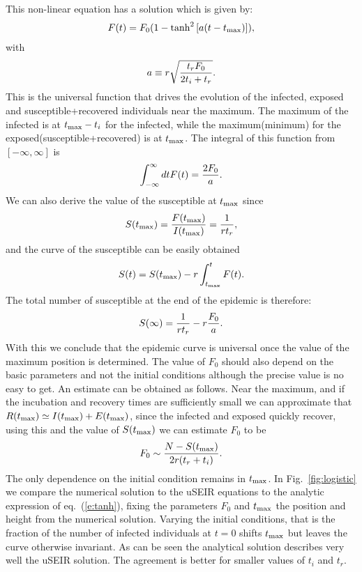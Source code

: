 \documentclass[a4paper,oneside,11pt]{article}
\begin{document}
 This non-linear equation has a solution which is given by:
\begin{eqnarray}
F(t) = F_0 \large(1 - \tanh^2\left[ a (t-t_{\rm max})\right]\large),
\label{eq:tanh}
\end{eqnarray}
with
\begin{eqnarray}
a\equiv r \sqrt{{t_r F_0\over 2 t_i+t_r}}.
\label{eq:a}
\end{eqnarray}
This is the universal function that drives the evolution of the infected, exposed and susceptible+recovered individuals near the maximum. The maximum of the infected is at $t_{\rm max}-t_i$ for the infected, while the maximum(minimum) for the exposed(susceptible+recovered) is at $t_{\rm max}$. The integral of this function from $[-\infty, \infty]$ is
\begin{eqnarray}
\int_{-\infty}^{\infty} dt F(t) = {2 F_0 \over a}.
\end{eqnarray}
We can also derive the value of the susceptible at $t_{\rm max}$ since
\begin{eqnarray}
S(t_{\rm max}) = {F(t_{\rm max}) \over I(t_{\rm max})} = {1  \over r t_r},
\end{eqnarray}
and the curve of the susceptible can be easily obtained
\begin{eqnarray}
S(t) = S(t_{\rm max}) - r \int_{t_{\rm max}}^t F(t).
\end{eqnarray}
The total number of susceptible at the end of the epidemic is therefore:
\begin{eqnarray}
S(\infty) = {1\over r t_r } - r {F_0\over a}.
\end{eqnarray}
With this we conclude that the epidemic curve is universal once the value of the maximum position is determined. The value of $F_0$ should also
depend on the basic parameters and not the initial conditions although
the precise value is no easy to get. An estimate can be obtained as follows. Near the maximum, and if the incubation and recovery times are sufficiently small we can approximate that $R(t_{\rm max}) \simeq I(t_{\rm max}) + E(t_{\rm max})$, since the infected and exposed quickly recover, using this and the value of $S(t_{\rm max})$ we can estimate $F_0$ to be
\begin{eqnarray}
F_0 \sim {N-S(t_{\rm max})\over 2 r (t_r +  t_i)}.
\label{eq:rough}
\end{eqnarray}
The only dependence on the initial condition remains in $t_{\rm max}$.
In Fig.~\ref{fig:logistic} we compare the numerical solution to the uSEIR equations to the analytic expression of eq.~(\ref{e:tanh}), fixing the parameters $F_0$ and $t_{\rm max}$  the position and height from the numerical solution. Varying the initial conditions, that is the fraction of the number of infected individuals at $t=0$ shifts $t_{\rm max}$ but leaves the curve otherwise invariant. As can be seen the analytical solution describes very well the uSEIR solution. The agreement is better for smaller values of $t_i$ and $t_r$. 
\end{document}
